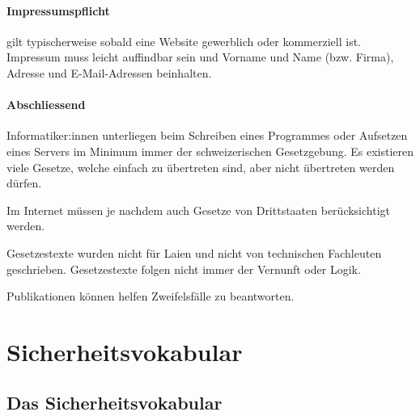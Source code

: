 \documentclass[a4paper,12pt]{article}
\begin{document}
\paragraph{Impressumspflicht} gilt typischerweise sobald eine Website gewerblich oder kommerziell ist. Impressum muss leicht auffindbar sein und Vorname und Name (bzw. Firma), Adresse und E-Mail-Adressen beinhalten.

\paragraph{Abschliessend} Informatiker:innen unterliegen beim Schreiben eines Programmes oder Aufsetzen eines Servers im Minimum immer der schweizerischen Gesetzgebung. Es existieren viele Gesetze, welche einfach zu übertreten sind, aber nicht übertreten werden dürfen.

Im Internet müssen je nachdem auch Gesetze von Drittstaaten berücksichtigt werden.

Gesetzestexte wurden nicht für Laien und nicht von technischen Fachleuten geschrieben. Gesetzestexte folgen nicht immer der Vernunft oder Logik.

Publikationen können helfen Zweifelsfälle zu beantworten.






\newpage
\section{Sicherheitsvokabular}

\subsection{Das Sicherheitsvokabular}
\end{document}
